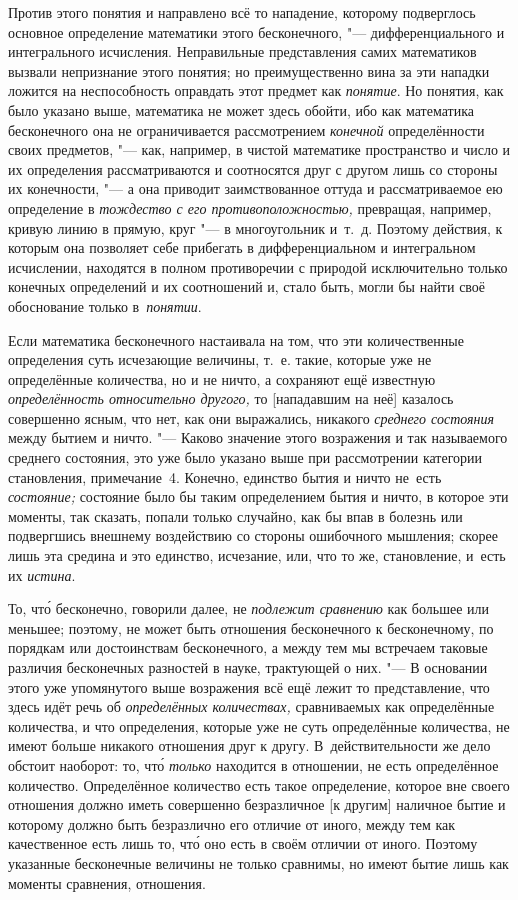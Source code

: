 Против этого понятия и направлено всё то нападение, которому подверглось
основное определение математики этого бесконечного, "--- дифференциального и
интегрального исчисления. Неправильные представления самих математиков вызвали
непризнание этого понятия; но преимущественно вина за эти нападки ложится на
неспособность оправдать этот предмет как {\em понятие}. Но понятия, как было
указано выше, математика не может здесь обойти, ибо как математика бесконечного
она не ограничивается рассмотрением {\em конечной} определённости своих
предметов, "--- как, например, в чистой математике пространство и число и их
определения рассматриваются и соотносятся друг с другом лишь со стороны их
конечности, "--- а она приводит заимствованное оттуда и рассматриваемое ею
определение в {\em тождество с его противоположностью,} превращая, например,
кривую линию в прямую, круг "--- в многоугольник и~т.~д. Поэтому действия, к которым
она позволяет себе прибегать в дифференциальном и интегральном исчислении,
находятся в полном противоречии с природой исключительно только конечных
определений и их соотношений и, стало быть, могли бы найти своё обоснование
только в~{\em понятии}.

Если математика бесконечного настаивала на том, что эти количественные
определения суть исчезающие величины, т.~е. такие, которые уже
не определённые количества, но и не ничто, а сохраняют ещё
известную {\em определённость относительно другого,} то
[нападавшим на неё] казалось совершенно ясным, что нет,
как они выражались, никакого {\em среднего состояния} между
бытием и ничто. "--- Каково значение этого возражения
и так называемого среднего состояния, это уже было указано
выше при рассмотрении категории становления, примечание~4. Конечно,
единство бытия и ничто не~есть {\em состояние;} состояние было бы
таким определением бытия и ничто, в которое эти моменты, так сказать, попали
только случайно, как бы впав в болезнь или подвергшись внешнему воздействию
со стороны ошибочного мышления; скорее лишь эта средина и это единство,
исчезание, или, что то же, становление, и~есть их {\em истина}.

То, чт\'{о} бесконечно, говорили далее, не {\em подлежит сравнению} как большее или
меньшее; поэтому, не может быть отношения бесконечного к бесконечному, по
порядкам или достоинствам бесконечного, а между тем мы встречаем таковые
различия бесконечных разностей в науке, трактующей о них. "--- В основании
этого уже упомянутого выше возражения всё ещё лежит то представление, что здесь
идёт речь об {\em определённых количествах,} сравниваемых как определённые
количества, и что определения, которые уже не суть определённые количества, не
имеют больше никакого отношения друг к другу. В~действительности же дело
обстоит наоборот: то, чт\'{о} {\em только} находится в отношении, не есть
определённое количество. Определённое количество есть такое определение,
которое вне своего отношения должно иметь совершенно безразличное [к другим]
наличное бытие и которому должно быть безразлично его отличие от
иного, между тем как качественное есть лишь то, чт\'{о} оно
есть в своём отличии от иного. Поэтому указанные бесконечные величины не
только сравнимы, но имеют бытие лишь как моменты сравнения, отношения.

